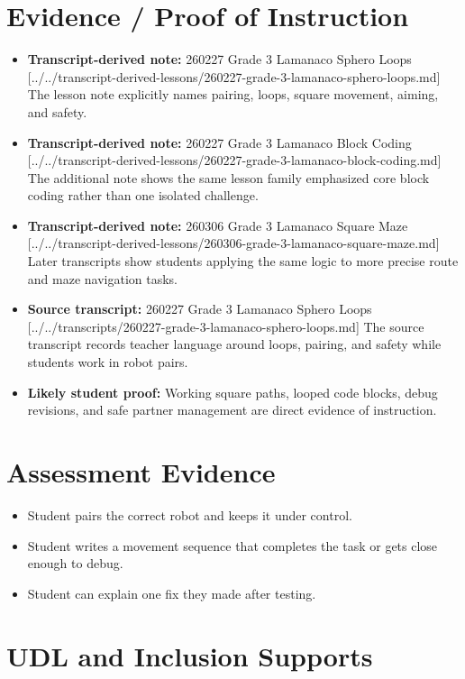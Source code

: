 \documentclass[11pt]{article}
\begin{document}
\section*{Evidence / Proof of Instruction}
\begin{itemize}[leftmargin=*]
\item \textbf{Transcript-derived note:} 260227 Grade 3 Lamanaco Sphero Loops [../../transcript-derived-lessons/260227-grade-3-lamanaco-sphero-loops.md] The lesson note explicitly names pairing, loops, square movement, aiming, and safety.
\item \textbf{Transcript-derived note:} 260227 Grade 3 Lamanaco Block Coding [../../transcript-derived-lessons/260227-grade-3-lamanaco-block-coding.md] The additional note shows the same lesson family emphasized core block coding rather than one isolated challenge.
\item \textbf{Transcript-derived note:} 260306 Grade 3 Lamanaco Square Maze [../../transcript-derived-lessons/260306-grade-3-lamanaco-square-maze.md] Later transcripts show students applying the same logic to more precise route and maze navigation tasks.
\item \textbf{Source transcript:} 260227 Grade 3 Lamanaco Sphero Loops [../../transcripts/260227-grade-3-lamanaco-sphero-loops.md] The source transcript records teacher language around loops, pairing, and safety while students work in robot pairs.
\item \textbf{Likely student proof:} Working square paths, looped code blocks, debug revisions, and safe partner management are direct evidence of instruction.
\end{itemize}

\section*{Assessment Evidence}
\begin{itemize}[leftmargin=*]
\item Student pairs the correct robot and keeps it under control.
\item Student writes a movement sequence that completes the task or gets close enough to debug.
\item Student can explain one fix they made after testing.
\end{itemize}

\section*{UDL and Inclusion Supports}
\end{document}
